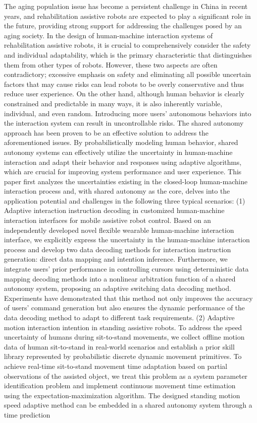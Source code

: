 \begin{abstract*}
The aging population issue has become a persistent challenge in China in recent years, and rehabilitation assistive robots are expected to play a significant role in the future, providing strong support for addressing the challenges posed by an aging society. In the design of human-machine interaction systems of rehabilitation assistive robots, it is crucial to comprehensively consider the safety and individual adaptability, which is the primary characteristic that distinguishes them from other types of robots. However, these two aspects are often contradictory; excessive emphasis on safety and eliminating all possible uncertain factors that may cause risks can lead robots to be overly conservative and thus reduce user experience. On the other hand, although human behavior is clearly constrained and predictable in many ways, it is also inherently variable, individual, and even random. Introducing more users' autonomous behaviors into the interaction system can result in uncontrollable risks. The shared autonomy approach has been proven to be an effective solution to address the aforementioned issues. By probabilistically modeling human behavior, shared autonomy systems can effectively utilize the uncertainty in human-machine interaction and adapt their behavior and responses using adaptive algorithms, which are crucial for improving system performance and user experience. This paper first analyzes the uncertainties existing in the closed-loop human-machine interaction process and, with shared autonomy as the core, delves into the application potential and challenges in the following three typical scenarios: (1) Adaptive interaction instruction decoding in customized human-machine interaction interfaces for mobile assistive robot control. Based on an independently developed novel flexible wearable human-machine interaction interface, we explicitly express the uncertainty in the human-machine interaction process and develop two data decoding methods for interaction instruction generation: direct data mapping and intention inference. Furthermore, we integrate users' prior performance in controlling cursors using deterministic data mapping decoding methods into a nonlinear arbitration function of a shared autonomy system, proposing an adaptive switching data decoding method. Experiments have demonstrated that this method not only improves the accuracy of users' command generation but also ensures the dynamic performance of the data decoding method to adapt to different task requirements. (2) Adaptive motion interaction intention in standing assistive robots. To address the speed uncertainty of humans during sit-to-stand movements, we collect offline motion data of human sit-to-stand in real-world scenarios and establish a prior skill library represented by probabilistic discrete dynamic movement primitives. To achieve real-time sit-to-stand movement time adaptation based on partial observations of the assisted object, we treat this problem as a system parameter identification problem and implement continuous movement time estimation using the expectation-maximization algorithm. The designed standing motion speed adaptive method can be embedded in a shared autonomy system through a time prediction 
\end{abstract*}
